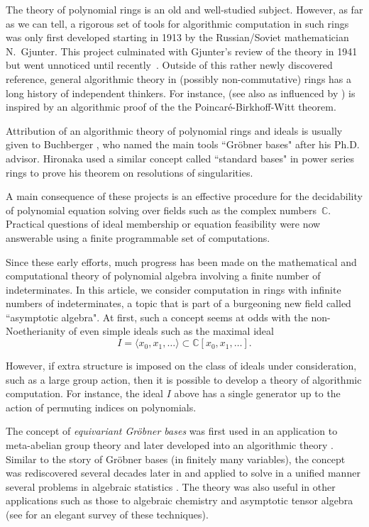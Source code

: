 
The theory of polynomial rings is an old and well-studied subject.  However, as far as we can tell, a rigorous set of tools for algorithmic computation in such rings was only first developed starting in 1913 \cite{gjunter1913} by the Russian/Soviet mathematician N.~Gjunter.  This project culminated with Gjunter's review of the theory in 1941 \cite{gunther1941modules} but went unnoticed until recently~\cite{renschuch2003contributions}.  Outside of this rather newly discovered reference, general algorithmic theory in (possibly non-commutative) rings has a long history of independent thinkers.  For instance, \cite{bergman1978diamond} (see also \cite{bokut1976embeddings} as influenced by \cite{shirshov1962some}) is inspired by an algorithmic proof of the the Poincar\'e-Birkhoff-Witt theorem.  

Attribution of an algorithmic theory of polynomial rings and ideals is usually given to Buchberger \cite{buchberger1965algorithmus}, who named the main tools ``Gr\"obner bases" after his Ph.D. advisor. Hironaka \cite{hironaka1964resolution} used a similar concept called ``standard bases" in power series rings to prove his theorem on resolutions of singularities.  

A main consequence of these projects is an effective procedure for the decidability of polynomial equation solving over fields such as the complex numbers~$\mathbb{C}$.  Practical questions of ideal membership or equation feasibility were now answerable using a finite programmable set of computations.  

Since these early efforts, much progress has been made on the mathematical and computational theory of polynomial algebra involving a finite number of indeterminates.  In this article, we consider computation in rings with infinite numbers of indeterminates, a topic that is part of a burgeoning new field called ``asymptotic algebra".  At first, such a concept seems at odds with the non-Noetherianity of even simple ideals such as the maximal ideal \[I = \langle x_0, x_1, \ldots  \rangle \subset \mathbb C[x_0, x_1,\ldots].\]

However, if extra structure is imposed on the class of ideals under consideration, such as a large group action, then it is possible to develop a theory of algorithmic computation.  For instance, the ideal $I$ above has a single generator up to the action of permuting indices on polynomials.

The concept of \emph{equivariant Gr\"obner bases} was first used in an application to meta-abelian group theory \cite{cohen1967laws} and later developed into an algorithmic theory \cite{Emmott, Cohen87}. Similar to the story of Gr\"obner bases (in finitely many variables), the concept was rediscovered several decades later in \cite{aschenbrenner2007finite, aschenbrenner2008algorithm} and applied to solve in a unified manner several problems in algebraic statistics \cite{hillar2012finite}.  The theory was also useful in other applications such as those to algebraic chemistry \cite{Draisma08b} and asymptotic tensor algebra \cite{draisma2014bounded} (see \cite{draisma2014noetherianity} for an elegant survey of these techniques).

